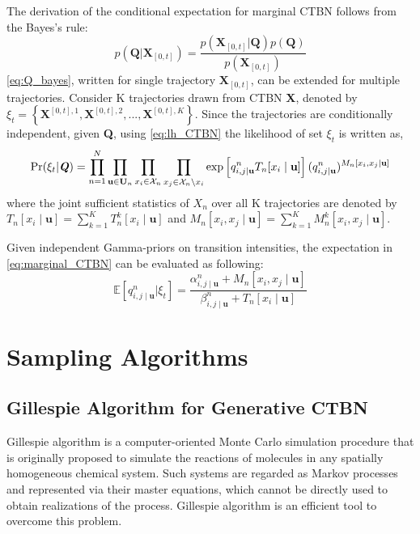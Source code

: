 The derivation of the conditional expectation for marginal CTBN follows from the Bayes's rule:
\begin{equation}
p\left(\textbf{Q} | \textbf{X}_{[0,t]}\right)=\frac{p\left(\textbf{X}_{[0,t]} | \textbf{Q}\right) p(\textbf{Q})}{p\left(\textbf{X}_{[0,t]}\right)}
\label{eq:Q_bayes}
\end{equation}
\autoref{eq:Q_bayes}, written for single trajectory $ \textbf{X}_{[0,t]} $, can be extended for multiple trajectories. Consider K trajectories drawn from CTBN \textbf{X}, denoted by $ \xi_t = \left\lbrace \textbf{X}^{[0,t], 1}, \textbf{X}^{[0,t], 2}, ..., \textbf{X}^{[0,t], K} \right\rbrace  $. Since the trajectories are conditionally independent, given \textbf{Q}, using \autoref{eq:lh_CTBN} the likelihood of set $ \xi_t $ is written as,
\begin{align}
\operatorname{Pr}( \xi_t  | \textbf{\textit{Q}} ) = \prod_{n=1}^{N} \prod_{\textbf{u} \in \mathcal{\textbf{U}}_{n}} \prod_{x_i \in \mathcal{X}_{n}} \prod_{x_j \in \mathcal{X}_{n} \backslash x_i}
\exp \left[q_{i,j\mid \textbf{u}}^{n} T_{n}[x_i\mid \textbf{u}]\right] (q_{i,j\mid \textbf{u}}^{n})^{M_{n}[x_i, x_j\mid \textbf{u}]}
\label{eq:lh_dataset_CTBN}
\end{align}
where the joint sufficient statistics of $ X_n $ over all K trajectories are denoted by  $ T_{n}[x_i\mid \textbf{u}] = \sum_{k=1}^{K} T_{n}^k[x_i\mid \textbf{u}] $ and $ M_{n}[x_i, x_j\mid \textbf{u}] =\sum_{k=1}^{K} M_{n}^k[x_i, x_j\mid \textbf{u}]$.

Given independent Gamma-priors on transition intensities, the expectation in \autoref{eq:marginal_CTBN} can be evaluated as following:
\begin{equation}
	\mathbb{E}\left[q_{i,j\mid \textbf{u}}^{n} | \xi_{t}\right]=\frac{\alpha^n_{i,j\mid \textbf{u}}+M_{n}[x_i, x_j\mid \textbf{u}]}{\beta^n_{i,j\mid \textbf{u}}+T_{n}[x_i \mid \textbf{u}]}
	\label{eq:estimated_Q}
\end{equation}

\section{Sampling Algorithms}
\label{sec:sampling_alg}
\subsection{Gillespie Algorithm for Generative CTBN}
Gillespie algorithm is a computer-oriented Monte Carlo simulation procedure that is originally proposed to simulate the reactions of molecules in any spatially homogeneous chemical system. Such systems are regarded as Markov processes and represented via their master equations, which cannot be directly used to obtain realizations of the process. Gillespie algorithm is an efficient tool to overcome this problem. \cite{Gillespie1976}


